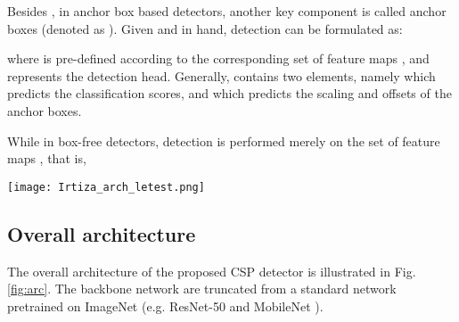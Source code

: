 Besides , in anchor box based detectors, another key component is called anchor boxes (denoted as ). Given  and  in hand, detection can be formulated as:

where  is pre-defined according to the corresponding set of feature maps , and  represents the detection head. Generally,  contains two elements, namely  which predicts the classification scores, and  which predicts the scaling and offsets of the anchor boxes.

While in box-free detectors, detection is performed merely on the set of feature maps , that is,


\begin{figure*}
\begin{center}
\texttt{[image: Irtiza\_arch\_letest.png]}
\end{center}
   \caption{Overall architecture of CSP, which mainly comprises two components, i.e. the feature extraction module and the detection head. The feature extraction module concatenates feature maps of different resolutions into a single one. The detection head merely contains a 3x3 convolutional layer, followed by three prediction layers, for the offset prediction, center location and the the corresponding scale.}
\label{fig:arc}
\end{figure*}

\subsection{Overall architecture}\label{sec:arc}
The overall architecture of the proposed CSP detector is illustrated in Fig. \ref{fig:arc}. The backbone network are truncated from a standard network pretrained on ImageNet \cite{deng2009imagenet} (e.g. ResNet-50 \cite{he2016deep} and MobileNet \cite{howard2017mobilenets}).

